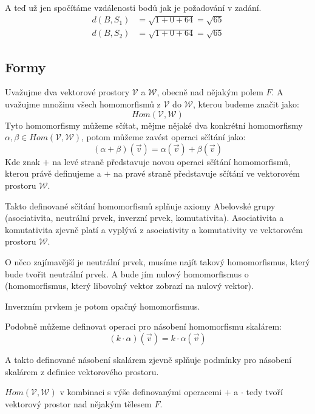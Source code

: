 \begin{example}
    A teď už jen spočítáme vzdálenosti bodů jak je požadování v zadání.
    \begin{align*}
        d(B, S_1) &= \sqrt{1 + 0 + 64} = \sqrt{65}\\
        d(B, S_2) &= \sqrt{1 + 0 + 64} = \sqrt{65}
    \end{align*}
\end{example}

\subsection{Formy}
Uvažujme dva vektorové prostory $\mathcal{V}$ a $\mathcal{W}$, obecně nad nějakým
polem $F$. A uvažujme množinu všech homomorfismů z $\mathcal{V}$ do $\mathcal{W}$, kterou
budeme značit jako:
$$Hom(\mathcal{V}, \mathcal{W})$$
Tyto homomorfismy můžeme sčítat, mějme nějaké dva konkrétní homomorfismy
$\alpha, \beta \in Hom(\mathcal{V}, \mathcal{W})$,
potom můžeme zavést operaci sčítání jako:
$$(\alpha + \beta)(\vec{v}) = \alpha(\vec{v}) + \beta(\vec{v})$$
Kde znak $+$ na levé straně představuje novou operaci sčítání homomorfismů,
kterou právě definujeme a $+$ na pravé straně představuje sčítání ve vektorovém prostoru
$\mathcal{W}$.

Takto definované sčítání homomorfismů splňuje axiomy Abelovské grupy
(asociativita, neutrální prvek, inverzní prvek, komutativita).
Asociativita a komutativita zjevně platí a vyplývá z asociativity a komutativity
ve vektorovém prostoru $\mathcal{W}$.

O něco zajímavější je neutrální
prvek, musíme najít takový homomorfismus, který bude tvořit neutrální prvek.
A bude jím nulový homomorfismus o (homomorfismus, který libovolný vektor zobrazí
na nulový vektor).

Inverzním prvkem je potom opačný homomorfismus.

Podobně můžeme definovat operaci pro násobení homomorfismu skalárem:
$$(k \cdot \alpha)(\vec{v}) = k \cdot \alpha(\vec{v})$$

A takto definované násobení skalárem zjevně splňuje podmínky
pro násobení skalárem z definice vektorového prostoru.

$Hom(\mathcal{V}, \mathcal{W})$ v kombinaci s výše definovanými operacemi $+$ a $\cdot$
tedy tvoří vektorový prostor nad nějakým tělesem $F$.


